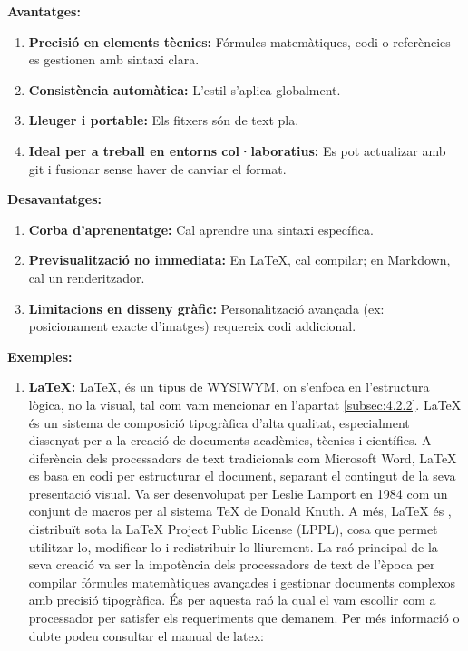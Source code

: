 \begin{enumerate}
 \textbf{Avantatges:}
    \begin{enumerate}
     \item \textbf{Precisió en elements tècnics:} Fórmules matemàtiques, codi o referències es gestionen amb sintaxi clara.
     \item \textbf{Consistència automàtica:} L'estil s'aplica globalment.
     \item \textbf{Lleuger i portable:} Els fitxers són de text pla.
     \item \textbf{Ideal per a treball en entorns col·laboratius:} Es pot actualizar amb git i fusionar sense haver de canviar el format.
    \end{enumerate}
 \textbf{Desavantatges:}
    \begin{enumerate}
     \item \textbf{Corba d'aprenentatge:} Cal aprendre una sintaxi específica.
     \item \textbf{Previsualització no immediata:} En LaTeX, cal compilar; en Markdown, cal un renderitzador.
     \item \textbf{Limitacions en disseny gràfic:} Personalització avançada (ex: posicionament exacte d'imatges) requereix codi addicional.
    \end{enumerate}
      \textbf{Exemples:}
         \begin{enumerate}

          \item \textbf{\LaTeX:} \LaTeX, és un tipus de WYSIWYM, on s'enfoca en l'estructura lògica, no la visual, tal com vam mencionar en l'apartat \ref{subsec:4.2.2}. LaTeX és un sistema de composició tipogràfica d'alta qualitat, especialment dissenyat per a la creació de documents acadèmics, tècnics i científics. A diferència dels processadors de text tradicionals com Microsoft Word, LaTeX es basa en codi per estructurar el document, separant el contingut de la seva presentació visual. Va ser desenvolupat per Leslie Lamport en 1984 com un conjunt de macros per al sistema TeX de Donald Knuth. A més, \LaTeX{} és , distribuït sota la LaTeX Project Public License (LPPL), cosa que permet utilitzar-lo, modificar-lo i redistribuir-lo lliurement. La raó principal de la seva creació va ser la impotència dels processadors de text de l'època per compilar fórmules matemàtiques avançades i gestionar documents complexos amb precisió tipogràfica. És per aquesta raó la qual el vam escollir com a processador per satisfer els requeriments que demanem. Per més informació o dubte podeu consultar el manual de latex: \cite{ManualdeLaTeX}


\end{enumerate}
\end{enumerate}
